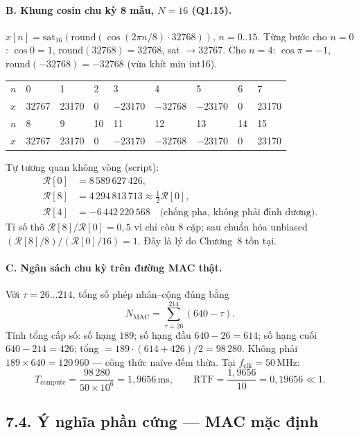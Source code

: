 \paragraph{B. Khung cosin chu kỳ 8 mẫu, $N=16$ (Q1.15).}
$x[n] = \mathrm{sat}_{16}(\mathrm{round}(\cos(2\pi n/8)\cdot 32768))$, $n=0..15$. Từng bước cho $n=0$: $\cos 0 = 1$, $\mathrm{round}(32768)=32768$, sat $\to 32767$. Cho $n=4$: $\cos\pi = -1$, $\mathrm{round}(-32768)=-32768$ (vừa khít min int16).
\begin{center}\footnotesize
\begin{tabular}{@{}lllllllll@{}}\toprule
$n$ & 0 & 1 & 2 & 3 & 4 & 5 & 6 & 7 \\
$x$ & 32767 & 23170 & 0 & $-23170$ & $-32768$ & $-23170$ & 0 & 23170 \\
\midrule
$n$ & 8 & 9 & 10 & 11 & 12 & 13 & 14 & 15 \\
$x$ & 32767 & 23170 & 0 & $-23170$ & $-32768$ & $-23170$ & 0 & 23170 \\
\bottomrule
\end{tabular}
\end{center}
Tự tương quan không vòng (script):
\begin{align*}
\mathcal{R}[0] &= 8\,589\,627\,426,\\
\mathcal{R}[8] &= 4\,294\,813\,713 \approx \tfrac12\mathcal{R}[0],\\
\mathcal{R}[4] &= -6\,442\,220\,568 \quad\text{(chống pha, không phải đỉnh dương)}.
\end{align*}
Tỉ số thô $\mathcal{R}[8]/\mathcal{R}[0] = 0{,}5$ vì chỉ còn 8 cặp; sau chuẩn hóa unbiased $(\mathcal{R}[8]/8)/(\mathcal{R}[0]/16) = 1$. Đây là lý do Chương~8 tồn tại.

\paragraph{C. Ngân sách chu kỳ trên đường MAC thật.}
Với $\tau = 26\ldots 214$, tổng số phép nhân--cộng đúng bằng
\[
N_{\mathrm{MAC}} = \sum_{\tau=26}^{214}(640-\tau).
\]
Tính tổng cấp số: số hạng $189$; số hạng đầu $640-26=614$; số hạng cuối $640-214=426$; tổng $= 189\cdot(614+426)/2 = 98\,280$.
Không phải $189\times 640 = 120\,960$ --- công thức naïve đếm thừa. Tại $f_{\mathrm{clk}} = 50\,\text{MHz}$:
\[
T_{\mathrm{compute}} = \frac{98\,280}{50\times 10^6} = 1{,}9656\,\text{ms}, \qquad
\mathrm{RTF} = \frac{1{,}9656}{10} = 0{,}19656 \ll 1.
\]

\subsection*{7.4. Ý nghĩa phần cứng --- MAC mặc định}

